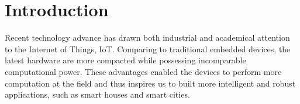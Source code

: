 \chapter{Introduction}
%
%
%
Recent technology advance has drawn both industrial and academical attention  to the Internet of Things, IoT. Comparing to traditional embedded devices, the latest hardware are more compacted while possessing incomparable computational power. These advantages enabled the devices to perform more computation at the field and thus inspires us to built more intelligent and robust applications, such as smart houses and smart cities. 